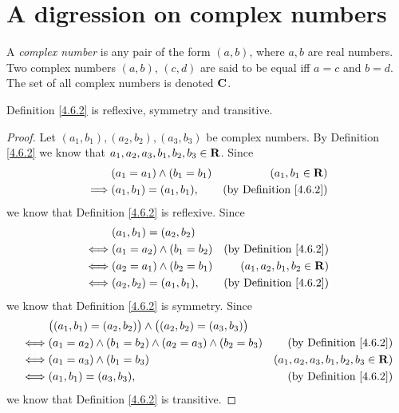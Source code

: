\section{A digression on complex numbers}\label{sec 4.6}

\setcounter{theorem}{1}
\begin{definition}\label{4.6.2}
    A \emph{complex number} is any pair of the form \((a, b)\), where \(a, b\) are real numbers.
    Two complex numbers \((a, b)\), \((c, d)\) are said to be equal iff \(a = c\) and \(b = d\).
    The set of all complex numbers is denoted \(\mathbf{C}\).
\end{definition}

\begin{additional corollary}\label{ac 4.6.1}
Definition \ref{4.6.2} is reflexive, symmetry and transitive.
\end{additional corollary}

\begin{proof}
    Let \((a_1, b_1), (a_2, b_2), (a_3, b_3)\) be complex numbers.
    By Definition \ref{4.6.2} we know that \(a_1, a_2, a_3, b_1, b_2, b_3 \in \mathbf{R}\).
    Since
    \begin{align*}
                 & (a_1 = a_1) \land (b_1 = b_1) & (a_1, b_1 \in \mathbf{R})                  \\
        \implies & (a_1, b_1) = (a_1, b_1),      & \text{(by Definition \ref{4.6.2})}
    \end{align*}
    we know that Definition \ref{4.6.2} is reflexive.
    Since
    \begin{align*}
             & (a_1, b_1) = (a_2, b_2)                                            \\
        \iff & (a_1 = a_2) \land (b_1 = b_2) & \text{(by Definition \ref{4.6.2})} \\
        \iff & (a_2 = a_1) \land (b_2 = b_1) & (a_1, a_2, b_1, b_2 \in \mathbf{R})        \\
        \iff & (a_2, b_2) = (a_1, b_1),      & \text{(by Definition \ref{4.6.2})}
    \end{align*}
    we know that Definition \ref{4.6.2} is symmetry.
    Since
    \begin{align*}
             & \big((a_1, b_1) = (a_2, b_2)\big) \land \big((a_2, b_2) = (a_3, b_3)\big)                                         \\
        \iff & (a_1 = a_2) \land (b_1 = b_2) \land (a_2 = a_3) \land (b_2 = b_3)         & \text{(by Definition \ref{4.6.2})}    \\
        \iff & (a_1 = a_3) \land (b_1 = b_3)                                             & (a_1, a_2, a_3, b_1, b_2, b_3 \in \mathbf{R}) \\
        \iff & (a_1, b_1) = (a_3, b_3),                                                  & \text{(by Definition \ref{4.6.2})}
    \end{align*}
    we know that Definition \ref{4.6.2} is transitive.
\end{proof}

